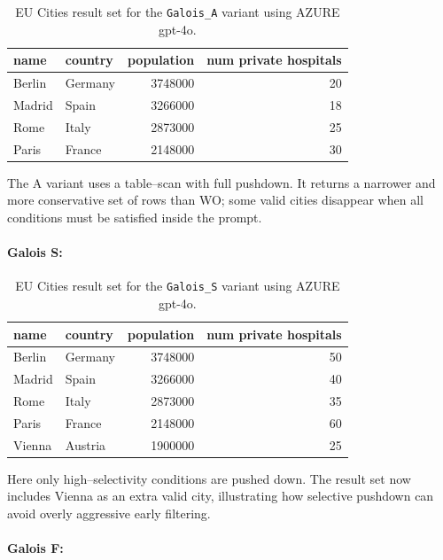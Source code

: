 \documentclass[11pt]{article}
\begin{document}
\begin{table}[h]
\centering
\begin{tabular}{l l r r}
\toprule
name   & country & population & num private hospitals \\
\midrule
Berlin & Germany & 3748000 & 20 \\
Madrid & Spain   & 3266000 & 18 \\
Rome   & Italy   & 2873000 & 25 \\
Paris  & France  & 2148000 & 30 \\
\bottomrule
\end{tabular}
\caption{EU Cities result set for the \texttt{Galois\_A} variant using AZURE gpt-4o.}
\end{table}

The A variant uses a table–scan with full pushdown. It returns a narrower and more conservative set of rows than WO; some valid cities disappear when all conditions must be satisfied inside the prompt.

\paragraph{Galois S:}

\begin{table}[h]
\centering
\begin{tabular}{l l r r}
\toprule
name   & country & population & num private hospitals \\
\midrule
Berlin   & Germany & 3748000 & 50 \\
Madrid   & Spain   & 3266000 & 40 \\
Rome     & Italy   & 2873000 & 35 \\
Paris    & France  & 2148000 & 60 \\
Vienna   & Austria & 1900000 & 25 \\
\bottomrule
\end{tabular}
\caption{EU Cities result set for the \texttt{Galois\_S} variant using AZURE gpt-4o.}
\end{table}

Here only high–selectivity conditions are pushed down. The result set now includes Vienna as an extra valid city, illustrating how selective pushdown can avoid overly aggressive early filtering.

\paragraph{Galois F:}
\end{document}

